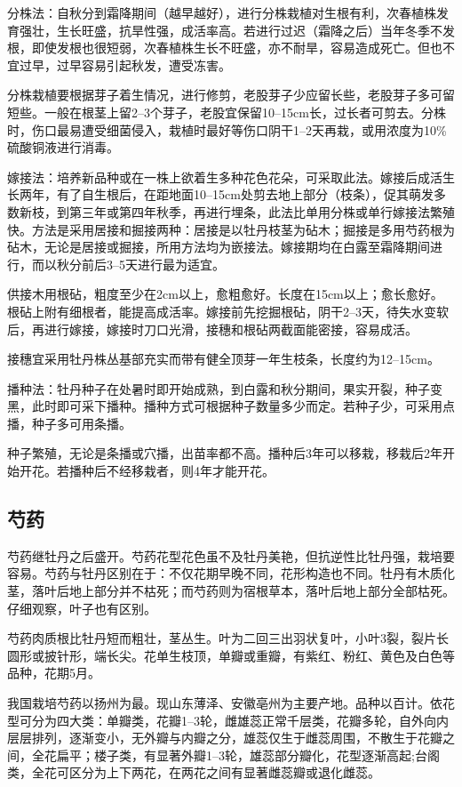 \documentclass{ctexbook}
\begin{document}
分株法：自秋分到霜降期间（越早越好），进行分株栽植对生根有利，次春植株发育强壮，生长旺盛，抗旱性强，成活率高。若进行过迟（霜降之后）当年冬季不发根，即使发根也很短弱，次春植株生长不旺盛，亦不耐旱，容易造成死亡。但也不宜过早，过早容易引起秋发，遭受冻害。

分株栽植要根据芽子着生情况，进行修剪，老股芽子少应留长些，老股芽子多可留短些。一般在根茎上留2--3个芽子，老股宜保留10--15cm长，过长者可剪去。分株时，伤口最易遭受细菌侵入，栽植时最好等伤口阴干1--2天再栽，或用浓度为10\%硫酸铜液进行消毒。

嫁接法：培养新品种或在一株上欲着生多种花色花朵，可采取此法。嫁接后成活生长两年，有了自生根后，在距地面10--15cm处剪去地上部分（枝条），促其萌发多数新枝，到第三年或第四年秋季，再进行埋条，此法比单用分株或单行嫁接法繁殖快。方法是采用居接和掘接两种：居接是以牡丹枝茎为砧木；掘接是多用芍药根为砧木，无论是居接或掘接，所用方法均为嵌接法。嫁接期均在白露至霜降期间进行，而以秋分前后3--5天进行最为适宜。

供接木用根砧，粗度至少在2cm以上，愈粗愈好。长度在15cm以上；愈长愈好。根砧上附有细根者，能提高成活率。嫁接前先挖掘根砧，阴干2--3天，待失水变软后，再进行嫁接，嫁接时刀口光滑，接穗和根砧两截面能密接，容易成活。

接穗宜采用牡丹株丛基部充实而带有健全顶芽一年生枝条，长度约为12--15cm。

播种法：牡丹种子在处暑时即开始成熟，到白露和秋分期间，果实开裂，种子变黑，此时即可采下播种。播种方式可根据种子数量多少而定。若种子少，可采用点播，种子多可用条播。

种子繁殖，无论是条播或穴播，出苗率都不高。播种后3年可以移栽，移栽后2年开始开花。若播种后不经移栽者，则4年才能开花。
\subsection{芍药}
芍药继牡丹之后盛开。芍药花型花色虽不及牡丹美艳，但抗逆性比牡丹强，栽培要容易。芍药与牡丹区别在于：不仅花期早晚不同，花形构造也不同。牡丹有木质化茎，落叶后地上部分并不枯死；而芍药则为宿根草本，落叶后地上部分全部枯死。仔细观察，叶子也有区别。

芍药肉质根比牡丹短而粗壮，茎丛生。叶为二回三出羽状复叶，小叶3裂，裂片长圆形或披针形，端长尖。花单生枝顶，单瓣或重瓣，有紫红、粉红、黄色及白色等品种，花期5月。

我国栽培芍药以扬州为最。现山东薄泽、安徽亳州为主要产地。品种以百计。依花型可分为四大类：单瓣类，花瓣1--3轮，雌雄蕊正常千层类，花瓣多轮，自外向内层层排列，逐渐变小，无外瓣与内瓣之分，雄蕊仅生于雌蕊周围，不散生于花瓣之间，全花扁平；楼子类，有显著外瓣1--3轮，雄蕊部分瓣化，花型逐渐高起;台阁类，全花可区分为上下两花，在两花之间有显著雌蕊瓣或退化雌蕊。
\end{document}
